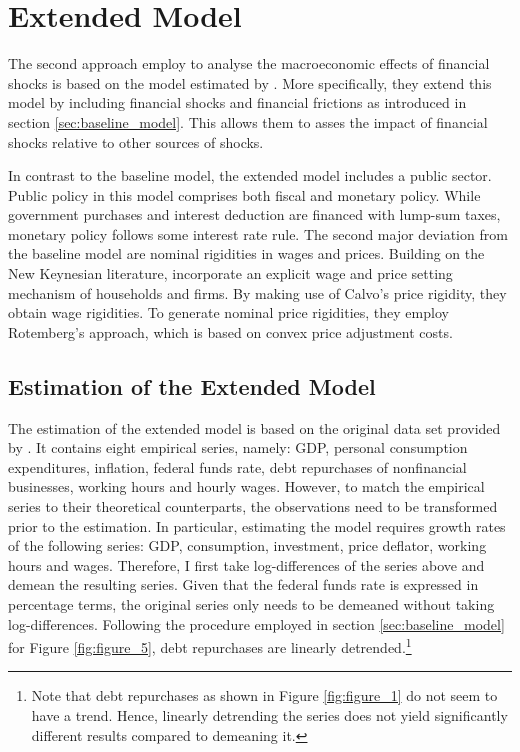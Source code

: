 \newpage

\section{Extended Model}
\label{sec:extended_model}

The second approach \citeauthor{JERMANNfinancial} employ to analyse the macroeconomic effects of financial shocks is based on the model estimated by \citet{SMETSshocks}. More specifically, they extend this model by including financial shocks and financial frictions as introduced in section \ref{sec:baseline_model}. This allows them to  asses the impact of financial shocks relative to other sources of shocks. 

In contrast to the baseline model, the extended model includes a public sector. Public policy in this model comprises both fiscal and monetary policy. While government purchases and  interest deduction are financed with lump-sum taxes, monetary policy follows some  interest rate rule. The second major deviation from the baseline model are nominal rigidities in wages and prices. Building on the New Keynesian literature, \citeauthor{JERMANNfinancial} incorporate an explicit wage and price setting mechanism of households and firms. By making use of Calvo's price rigidity, they obtain wage rigidities. To generate nominal price rigidities, they employ Rotemberg's approach, which is based on convex price adjustment costs.


\subsection{Estimation of the Extended Model}
\label{sec:extended_model_estimation}



The estimation of the extended model is based on the original data set provided by \citeauthor{JERMANNfinancial}. It contains eight empirical series, namely: GDP, personal consumption expenditures, inflation, federal funds rate, debt repurchases of nonfinancial businesses, working hours and hourly wages. However, to match the empirical series to their theoretical counterparts, the observations need to be transformed prior to the estimation. In particular, estimating the model requires growth rates of the following series: GDP, consumption, investment, price deflator, working hours and wages. Therefore, I first take log-differences of the series above  and demean the resulting series. Given that the federal funds rate is expressed in percentage terms, the original series only needs to be demeaned without taking log-differences. Following the procedure employed in section \ref{sec:baseline_model} for Figure \ref{fig:figure_5}, debt repurchases are linearly detrended.\footnote{Note that debt repurchases as shown in Figure \ref{fig:figure_1} do not seem to have a trend. Hence, linearly detrending the series does not yield significantly different results  compared to demeaning it.}

